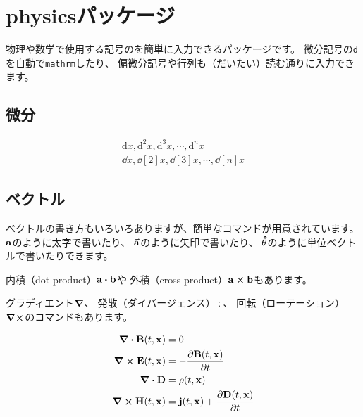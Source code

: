 \section{physicsパッケージ}

物理や数学で使用する記号のを簡単に入力できるパッケージです。
微分記号の\texttt{d}を自動で\texttt{mathrm}したり、
偏微分記号や行列も（だいたい）読む通りに入力できます。

\subsection{微分}

\begin{align}
  \mathrm{d}x, \mathrm{d}^{2}x, \mathrm{d}^{3}x, \cdots, \mathrm{d}^{n}x\\
  \dd{x}, \dd[2]{x}, \dd[3]{x}, \cdots, \dd[n]{x}
\end{align}

\subsection{ベクトル}

ベクトルの書き方もいろいろありますが、簡単なコマンドが用意されています。
$\vb{a}$のように太字で書いたり、
$\va{a}$のように矢印で書いたり、
$\vu{\theta}$のように単位ベクトルで書いたりできます。

内積（dot product）$\vb{a} \dotproduct \vb{b}$や
外積（cross product）$\vb{a} \crossproduct \vb{b}$もあります。

グラディエント$\grad$、
発散（ダイバージェンス）$\div$、
回転（ローテーション）$\curl$のコマンドもあります。

\begin{align}
  \div \vb{B}(t,\vb{x}) & = 0\\
  \curl \vb{E}(t,\vb{x}) & = - \pdv{\vb{B}(t,\vb{x})}{t}\\
  \div \vb{D} & = \rho(t,\vb{x})\\
  \curl \vb{H}(t,\vb{x}) & = \vb{j}(t,\vb{x}) + \pdv{\vb{D}(t,\vb{x})}{t}
\end{align}
